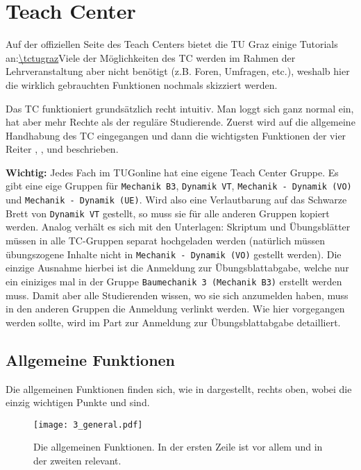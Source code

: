 \chapter{Teach Center}

Auf der offiziellen Seite des Teach Centers bietet die TU Graz einige Tutorials 
an:\linebreak\url{\tctugraz}\linebreak Viele der Möglichkeiten des TC
werden im Rahmen der Lehrveranstaltung aber nicht benötigt (z.B. Foren,
Umfragen, etc.), weshalb hier die wirklich gebrauchten Funktionen nochmals
skizziert werden.

Das TC funktioniert grundsätzlich recht intuitiv. Man loggt sich ganz normal 
ein, hat aber mehr Rechte als der reguläre Studierende. Zuerst wird auf die
allgemeine Handhabung des TC eingegangen und dann die wichtigsten Funktionen 
der vier Reiter , , 
 und  beschrieben.

{\bf Wichtig:} Jedes Fach im TUGonline hat eine eigene Teach Center Gruppe. 
Es gibt eine eige Gruppen für {\tt Mechanik B3}, 
{\tt Dynamik VT}, {\tt Mechanik - Dynamik (VO)} und 
{\tt Mechanik - Dynamik (UE)}. Wird also eine Verlautbarung auf das Schwarze
Brett von {\tt Dynamik VT} gestellt, so muss sie für alle anderen Gruppen
kopiert werden. Analog verhält es sich mit den Unterlagen: Skriptum und
Übungsblätter müssen in alle TC-Gruppen separat hochgeladen werden (natürlich
müssen übungszogene Inhalte nicht in {\tt Mechanik - Dynamik (VO)}
gestellt werden). Die einzige Ausnahme hierbei ist die Anmeldung zur
Übungsblattabgabe, welche nur ein einiziges mal in der Gruppe 
{\tt Baumechanik 3 (Mechanik B3)} erstellt werden muss. Damit aber alle
Studierenden wissen, wo sie sich anzumelden haben, muss in den anderen Gruppen
die Anmeldung verlinkt werden. Wie hier vorgegangen werden sollte, wird im Part
zur Anmeldung zur Übungsblattabgabe detailliert.

\section{Allgemeine Funktionen}

Die allgemeinen Funktionen finden sich, wie in  dargestellt,
rechts oben, wobei die einzig wichtigen Punkte  und
 sind.

\begin{figure}[htbp]
\begin{center}
  \texttt{[image: 3\_general.pdf]}
  \caption{ Die allgemeinen Funktionen. In der ersten Zeile ist vor allem 
     und in der zweiten  relevant.}
  \label{fig:general}
\end{center}
\end{figure}

